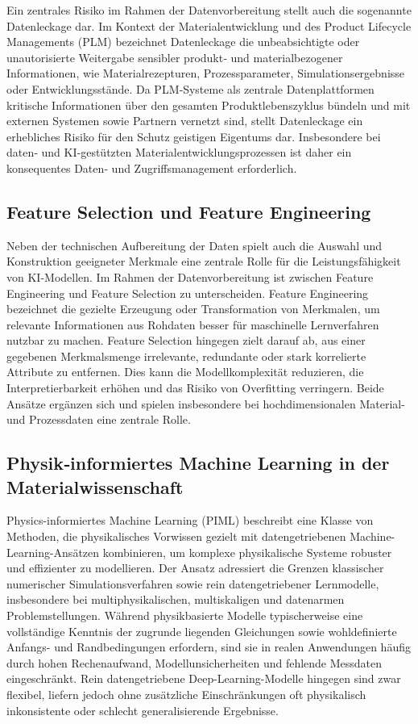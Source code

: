 Ein zentrales Risiko im Rahmen der Datenvorbereitung stellt auch die sogenannte Datenleckage dar. Im Kontext der Materialentwicklung und des Product Lifecycle Managements (PLM) bezeichnet Datenleckage die unbeabsichtigte oder unautorisierte Weitergabe sensibler produkt‑ und materialbezogener Informationen, wie Materialrezepturen, Prozessparameter, Simulationsergebnisse oder Entwicklungsstände. Da PLM‑Systeme als zentrale Datenplattformen kritische Informationen über den gesamten Produktlebenszyklus bündeln und mit externen Systemen sowie Partnern vernetzt sind, stellt Datenleckage ein erhebliches Risiko für den Schutz geistigen Eigentums dar. Insbesondere bei daten‑ und KI‑gestützten Materialentwicklungsprozessen ist daher ein konsequentes Daten‑ und Zugriffsmanagement erforderlich. \cite{alneyadi2016survey} \cite{chen2022blockchain} 

\subsection{Feature Selection und Feature Engineering}
Neben der technischen Aufbereitung der Daten spielt auch die Auswahl und Konstruktion geeigneter Merkmale eine zentrale Rolle für die Leistungsfähigkeit von KI-Modellen.
Im Rahmen der Datenvorbereitung ist zwischen Feature Engineering und Feature Selection zu unterscheiden. Feature Engineering bezeichnet die gezielte Erzeugung oder Transformation von Merkmalen, um relevante Informationen aus Rohdaten besser für maschinelle Lernverfahren nutzbar zu machen.
Feature Selection hingegen zielt darauf ab, aus einer gegebenen Merkmalsmenge irrelevante, redundante oder stark korrelierte Attribute zu entfernen. Dies kann die Modellkomplexität reduzieren, die Interpretierbarkeit erhöhen und das Risiko von Overfitting verringern. Beide Ansätze ergänzen sich und spielen insbesondere bei hochdimensionalen Material- und Prozessdaten eine zentrale Rolle. \cite{nargesian2017learning}


\subsection{Physik‑informiertes Machine Learning in der Materialwissenschaft}
Physics-informiertes Machine Learning (PIML) beschreibt eine Klasse von Methoden, die physikalisches Vorwissen gezielt mit datengetriebenen Machine-Learning-Ansätzen kombinieren, um komplexe physikalische Systeme robuster und effizienter zu modellieren. Der Ansatz adressiert die Grenzen klassischer numerischer Simulationsverfahren sowie rein datengetriebener Lernmodelle, insbesondere bei multiphysikalischen, multiskaligen und datenarmen Problemstellungen.
Während physikbasierte Modelle typischerweise eine vollständige Kenntnis der zugrunde liegenden Gleichungen sowie wohldefinierte Anfangs- und Randbedingungen erfordern, sind sie in realen Anwendungen häufig durch hohen Rechenaufwand, Modellunsicherheiten und fehlende Messdaten eingeschränkt. Rein datengetriebene Deep-Learning-Modelle hingegen sind zwar flexibel, liefern jedoch ohne zusätzliche Einschränkungen oft physikalisch inkonsistente oder schlecht generalisierende Ergebnisse. \cite{karniadakis2021physics}





